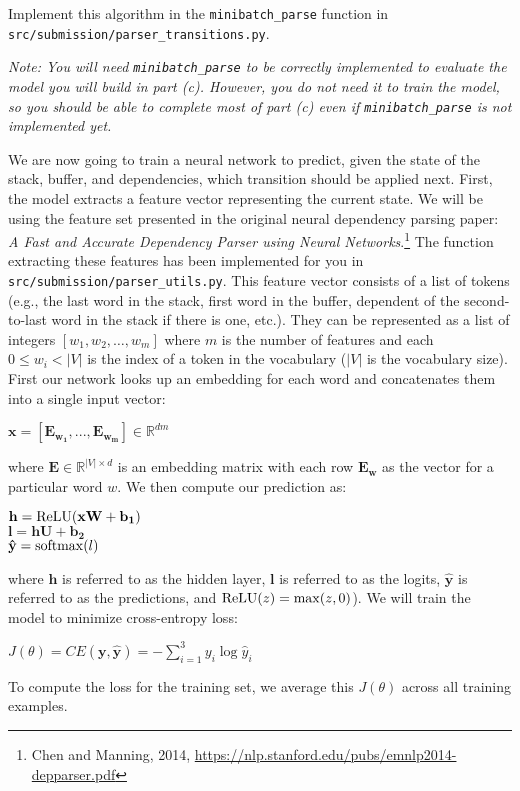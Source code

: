 \begin{enumerate}[(a)]
    Implement this algorithm in the \texttt{minibatch\_parse} function in \texttt{src/submission/parser\_transitions.py}.

    \textit{Note: You will need \texttt{minibatch\_parse} to be correctly implemented to evaluate the model you will build in part (c). However, you do not need it to train the model, so you should be able to complete most of part (c) even if \texttt{minibatch\_parse} is not implemented yet.} \newline
    
    We are now going to train a neural network to predict, given the state of the stack, buffer, and dependencies, which transition should be applied next.
    First, the model extracts a feature vector representing the current state. We will be using the feature set presented in the original neural dependency parsing paper: \textit{A Fast and Accurate Dependency Parser using Neural Networks}.\footnote{Chen and Manning, 2014, \url{https://nlp.stanford.edu/pubs/emnlp2014-depparser.pdf}} The function extracting these features has been implemented for you in \texttt{src/submission/parser\_utils.py}. This feature vector consists of a list of tokens (e.g., the last word in the stack, first word in the buffer, dependent of the second-to-last word in the stack if there is one, etc.). They can be represented as a list of integers $[w_1, w_2, \dots, w_m]$ where $m$ is the number of features and each $0 \leq w_i <  \vert V \vert$ is the index of a token in the vocabulary ($ \vert V \vert $ is the vocabulary size). First our network looks up an embedding for each word and concatenates them into a single input vector:
    \begin{center}
    	$ \mathbf{x} = [\mathbf{E_{w_1}} , ... , \mathbf{E_{w_m}}] \in \mathbb{R}^{dm}$
    \end{center}
    where $\mathbf{E} \in \mathbb{R}^{ \vert V \vert \times d}$ is an embedding matrix with each row $\mathbf{E_w}$ as the vector for a particular word $w$. We then compute our prediction as:
    \begin{center}
        $ \mathbf{h} = \operatorname{ReLU}(\mathbf{xW} + \mathbf{b_1})$ \\
        $ \mathbf{l} = \mathbf{hU} + \mathbf{b_2}$ \\
        $ \mathbf{\hat{y}} = \operatorname{softmax}(l)$\\
    \end{center}
    where $\mathbf{h}$ \space is referred to as the hidden layer, $\mathbf{l}$ \space is referred to as the logits, $\mathbf{\hat{y}}$ \space is referred to as the predictions, and $\operatorname{ReLU}(z) = \max(z, 0)$). We will train the model to minimize cross-entropy loss:
    \begin{center}
        $J(\theta) = CE(\mathbf{y}, \mathbf{\hat{y}}) = - \sum_{i=1}^3 y_i \log \hat{y}_i$
    \end{center}
    To compute the loss for the training set, we average this $J(\theta)$ across all training examples.


\end{enumerate}
